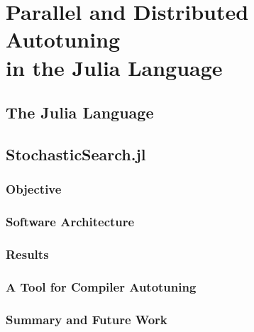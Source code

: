\chapter[Parallel and Distributed Autotuning in the Julia Language]{Parallel and Distributed Autotuning \\ in the Julia Language}
\label{chap:julia}

\section{The Julia Language}
\label{sec:julia}

\section{StochasticSearch.jl}
\label{sec:ss}

\subsection{Objective}
\label{subsec:obj}

\subsection{Software Architecture}
\label{subsec:arch}

\subsection{Results}
\label{subsec:res}

\subsection{A Tool for Compiler Autotuning}
\label{sec:stochastic-gpu-tuner}

\subsection{Summary and Future Work}
\label{subsec:concl}
